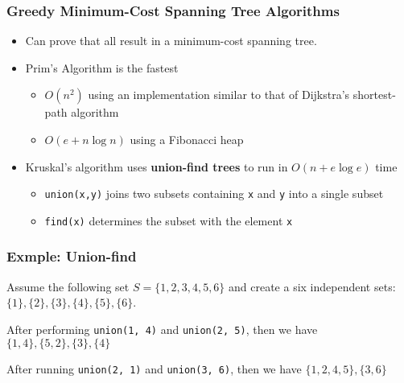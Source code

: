 \documentclass[newPxFont,sthlmFooter,nooffset]{beamer}
\begin{document}
\begin{frame}[t]
  \frametitle{Greedy Minimum-Cost Spanning Tree Algorithms}
  \begin{itemize}
  \item Can prove that all result in a minimum-cost spanning tree.
  \item Prim's Algorithm is the fastest
    \begin{itemize}
    \item $O(n^2)$ using an implementation similar to that of Dijkstra's shortest-path algorithm
    \item $O(e+n\log n)$ using a Fibonacci heap
    \end{itemize}
  \item Kruskal's algorithm uses \textbf{union-find trees} to run in $O(n+e \log e)$ time
    \begin{itemize}
    \item \texttt{union(x,y)} joins two subsets containing \texttt{x} and \texttt{y} into a single subset
    \item \texttt{find(x)} determines the subset with the element \texttt{x}
    \end{itemize}
  \end{itemize}
\end{frame}


\begin{frame}[t]
  \frametitle{Exmple: Union-find}
Assume the following set $S=\{1, 2, 3, 4, 5, 6\}$ and create a six independent sets: $\{1\}, \{2\}, \{3\}, \{4\}, \{5\}, \{6\}$.

After performing \texttt{union(1, 4)} and \texttt{union(2, 5)}, then we have $\{1, 4\}, \{5, 2\}, \{3\}, \{4\}$

After running \texttt{union(2, 1)} and \texttt{union(3, 6)}, then we have $\{1, 2, 4, 5\}, \{3, 6\}$


\begin{columns}
\end{columns}
\end{frame}

\begin{comment}
\begin{frame}[t]
  \frametitle{The code: union-find}

\end{frame}


\begin{frame}[t]
  \frametitle{}
\end{frame}
\end{comment}
\end{document}
